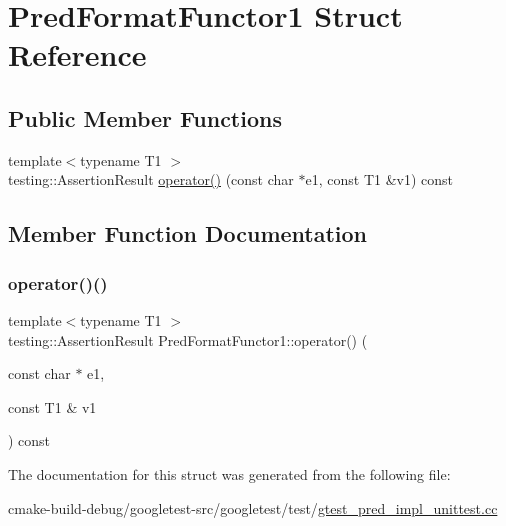 \hypertarget{structPredFormatFunctor1}{}\section{Pred\+Format\+Functor1 Struct Reference}
\label{structPredFormatFunctor1}
\subsection*{Public Member Functions}
\begin{DoxyCompactItemize}
\item 
{\footnotesize template$<$typename T1 $>$ }\\testing\+::\+Assertion\+Result \mbox{\hyperlink{structPredFormatFunctor1_ac2c414b5fa65b41b0ab5967f9f1e5bff}{operator()}} (const char $\ast$e1, const T1 \&v1) const
\end{DoxyCompactItemize}


\subsection{Member Function Documentation}
\mbox{\label{structPredFormatFunctor1_ac2c414b5fa65b41b0ab5967f9f1e5bff}} 
\subsubsection{\texorpdfstring{operator()()}{operator()()}}
{\footnotesize\ttfamily template$<$typename T1 $>$ \\
testing\+::\+Assertion\+Result Pred\+Format\+Functor1\+::operator() (\begin{DoxyParamCaption}\item[{const char $\ast$}]{e1,  }\item[{const T1 \&}]{v1 }\end{DoxyParamCaption}) const\hspace{0.3cm}{\ttfamily [inline]}}



The documentation for this struct was generated from the following file\+:\begin{DoxyCompactItemize}
\item 
cmake-\/build-\/debug/googletest-\/src/googletest/test/\mbox{\hyperlink{gtest__pred__impl__unittest_8cc}{gtest\+\_\+pred\+\_\+impl\+\_\+unittest.\+cc}}\end{DoxyCompactItemize}
